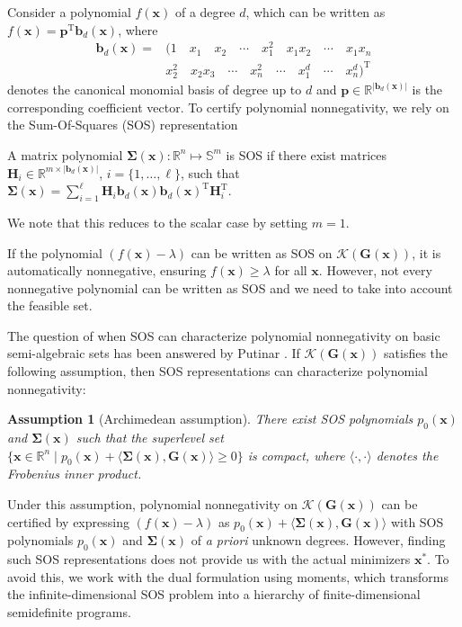 \documentclass[final,onefignum,onetabnum]{siamart220329}
\newtheorem{assumption}{Assumption}
\begin{document}
Consider a polynomial $f(\mathbf{x})$ of a degree $d$, which can be written as $f(\mathbf{x}) = \mathbf{p}^\mathrm{T}\mathbf{b}_d(\mathbf{x})$, where
%
\begin{equation}
\begin{aligned}
\mathbf{b}_d(\mathbf{x})=&\Big( 1 \quad x_1 \quad x_2 \quad \cdots \quad x_1^2 \quad x_1x_2 \quad  \cdots  \quad x_1x_n \\ &  x_2^2 \quad x_2x_3 \quad  \cdots \quad x_n^2 \quad \cdots \quad x_1^d \quad \cdots \quad x_n^d \Big)^\mathrm{T}
\end{aligned}
\label{strandard_basis}
\end{equation}
%
denotes the canonical monomial basis of degree up to $d$ and $\mathbf{p} \in \mathbb{R}^{|\mathbf{b}_d(\mathbf{x})|}$ is the corresponding coefficient vector. To certify polynomial nonnegativity, we rely on the Sum-Of-Squares (SOS) representation
%
\begin{definition}\label{def:sos}
    A matrix polynomial $\mathbf{\Sigma}(\mathbf{x}): \mathbb{R}^n\mapsto \mathbb{S}^m$ is SOS if there exist matrices $\mathbf{H}_i \in \mathbb{R}^{m\times |\mathbf{b}_d(\mathbf{x})|}$, $i = \{1,\ldots,\ell\}$, such that 
    $
        \mathbf{\Sigma}(\mathbf{x}) = \sum_{i=1}^{\ell} \mathbf{H}_i \mathbf{b}_d(\mathbf{x}) \mathbf{b}_d(\mathbf{x})^\mathrm{T} \mathbf{H}_i^\mathrm{T}.
    $
\end{definition}
%
We note that this reduces to the scalar case by setting $m=1$.

If the polynomial $(f{(\mathbf{x})}-\lambda)$ can be written as SOS on $\mathcal{K}(\mathbf{G}(\mathbf{x}))$, it is automatically nonnegative, {ensuring $f(\mathbf{x}) \geq \lambda$ for all $\mathbf{x}$. However, not every nonnegative polynomial can be written as SOS and we need to take into account the feasible set.}

{
The question of when SOS can characterize polynomial nonnegativity on basic semi-algebraic sets has been answered by Putinar \cite{putinar1993positive}. If $\mathcal{K}(\mathbf{G}(\mathbf{x}))$ satisfies the following assumption, then SOS representations can characterize polynomial nonnegativity:
%
\begin{assumption}[Archimedean assumption]\label{as:archimedean}
    There exist SOS polynomials $p_0(\mathbf{x})$ and $\bm{\Sigma}(\mathbf{x})$ such that the superlevel set 
    $\bigl\{\mathbf{x}\in\mathbb{R}^{n}\;\vert\; p_0(\mathbf{x}) + \langle \bm{\Sigma}(\mathbf{x}), \mathbf{G}(\mathbf{x})\rangle\ge 0\bigr\}$ 
    is compact, where $\langle \cdot, \cdot\rangle$ denotes the Frobenius inner product.
\end{assumption}
%
Under this assumption, polynomial nonnegativity on $\mathcal{K}(\mathbf{G}(\mathbf{x}))$ can be certified by expressing $(f(\mathbf{x})-\lambda)$ as $p_0(\mathbf{x}) + \langle \bm{\Sigma}(\mathbf{x}), \mathbf{G}(\mathbf{x})\rangle$ with SOS polynomials $p_0(\mathbf{x})$ and $\bm{\Sigma}(\mathbf{x})$ of \textit{a priori} unknown degrees. However, finding such SOS representations does not provide us with the actual minimizers $\mathbf{x}^*$. To avoid this, we work with the dual formulation using moments, which transforms the infinite-dimensional SOS problem into a hierarchy of finite-dimensional semidefinite programs.}
\end{document}
